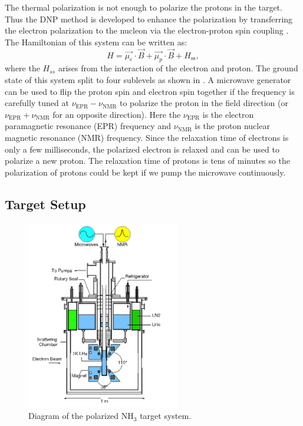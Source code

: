 The thermal polarization is not enough to polarize the protons in the target. Thus the DNP method is developed to enhance the polarization by transferring the electron polarization to the nucleon via the electron-proton spin coupling \cite{Overhauser1953,Jeffries1957}. The Hamiltonian of this system can be written as:
\begin{equation} \label{C5S3SS1E3}
H = \vec{\mu_e}\cdot\vec{B}+\vec{\mu_p}\cdot\vec{B}+H_{\mathrm{ss}},
\end{equation}
where the $H_{ss}$ arises from the interaction of the electron and proton. The ground state of this system split to four sublevels as shown in . A microwave generator can be used to flip the proton spin and electron spin together if the frequency is carefully tuned at $\nu_{\mathrm{EPR}}-\nu_{\mathrm{NMR}}$ to polarize the proton in the field direction (or $\nu_{\mathrm{EPR}}+\nu_{\mathrm{NMR}}$ for an opposite direction). Here the $\nu_{\mathrm{EPR}}$ is the electron paramagnetic resonance (EPR) frequency and $\nu_{\mathrm{NMR}}$ is the proton nuclear magnetic resonance (NMR) frequency. Since the relaxation time of electrons is only a few milliseconds, the polarized electron is relaxed and can be used to polarize a new proton. The relaxation time of protons is tens of minutes so the polarization of protons could be kept if we pump the microwave continuously.

\subsection{Target Setup}
\label{C5S3SS2}

\begin{figure}[b!]
  \centering
  \includegraphics[width=0.6\textwidth]{figs/target.png}
  \caption[Diagram of the polarized NH${}_3$ target system.]{Diagram of the polarized NH${}_3$ target system. \label{C5S3SS2F1}}
\end{figure}

